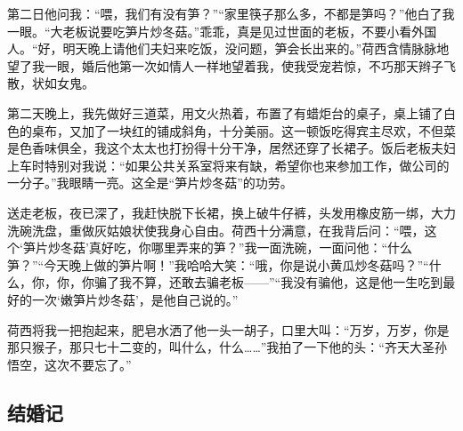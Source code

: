\par 第二日他问我：“喂，我们有没有笋？”“家里筷子那么多，不都是笋吗？”他白了我一眼。“大老板说要吃笋片炒冬菇。”乖乖，真是见过世面的老板，不要小看外国人。“好，明天晚上请他们夫妇来吃饭，没问题，笋会长出来的。”荷西含情脉脉地望了我一眼，婚后他第一次如情人一样地望着我，使我受宠若惊，不巧那天辫子飞散，状如女鬼。
\par 第二天晚上，我先做好三道菜，用文火热着，布置了有蜡炬台的桌子，桌上铺了白色的桌布，又加了一块红的铺成斜角，十分美丽。这一顿饭吃得宾主尽欢，不但菜是色香味俱全，我这个太太也打扮得十分干净，居然还穿了长裙子。饭后老板夫妇上车时特别对我说：“如果公共关系室将来有缺，希望你也来参加工作，做公司的一分子。”我眼睛一亮。这全是“笋片炒冬菇”的功劳。
\par 送走老板，夜已深了，我赶快脱下长裙，换上破牛仔裤，头发用橡皮筋一绑，大力洗碗洗盘，重做灰姑娘状使我身心自由。荷西十分满意，在我背后问：“喂，这个‘笋片炒冬菇’真好吃，你哪里弄来的笋？”我一面洗碗，一面问他：“什么笋？”“今天晚上做的笋片啊！”我哈哈大笑：“哦，你是说小黄瓜炒冬菇吗？”“什么，你，你，你骗了我不算，还敢去骗老板——”“我没有骗他，这是他一生吃到最好的一次‘嫩笋片炒冬菇’，是他自己说的。”
\par 荷西将我一把抱起来，肥皂水洒了他一头一胡子，口里大叫：“万岁，万岁，你是那只猴子，那只七十二变的，叫什么，什么……”我拍了一下他的头：“齐天大圣孙悟空，这次不要忘了。”


\subsection{结婚记}

